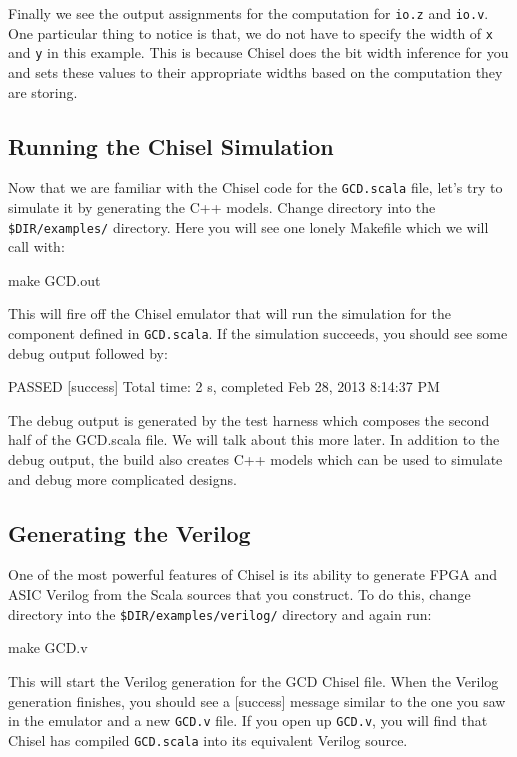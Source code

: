 Finally we see the output assignments for the computation for \verb+io.z+ and \verb+io.v+. One particular thing to notice is that, we do not have to specify the width of \verb+x+ and \verb+y+ in this example. This is because Chisel does the bit width inference for you and sets these values to their appropriate widths based on the computation they are storing.

\subsection{Running the Chisel Simulation}

Now that we are familiar with the Chisel code for the \verb+GCD.scala+ file, let's try to simulate it by generating the C++ models. Change directory into the \verb+$DIR/examples/+ directory. Here you will see one lonely Makefile which we will call with:

\begin{bash}
make GCD.out
\end{bash}

\noindent
This will fire off the Chisel emulator that will run the simulation for the component defined in \verb+GCD.scala+. If the simulation succeeds, you should see some debug output followed by:
\begin{footnotesize}
\begin{bash}
PASSED
[success] Total time: 2 s, completed Feb 28, 2013 8:14:37 PM
\end{bash}
\end{footnotesize}

The debug output is generated by the test harness which composes the second half of the GCD.scala file. We will talk about this more later. In addition to the debug output, the build also creates C++ models which can be used to simulate and debug more complicated designs.

\subsection{Generating the Verilog}

One of the most powerful features of Chisel is its ability to generate FPGA and ASIC Verilog from the Scala sources that you construct. To do this, change directory into the \verb+$DIR/examples/verilog/+ directory and again run:
\begin{bash}
make GCD.v
\end{bash}
This will start the Verilog generation for the GCD Chisel file. When the Verilog generation finishes, you should see a [success] message similar to the one you saw in the emulator and a new \verb+GCD.v+ file. If you open up \verb+GCD.v+, you will find that Chisel has compiled \verb+GCD.scala+ into its equivalent Verilog source.

